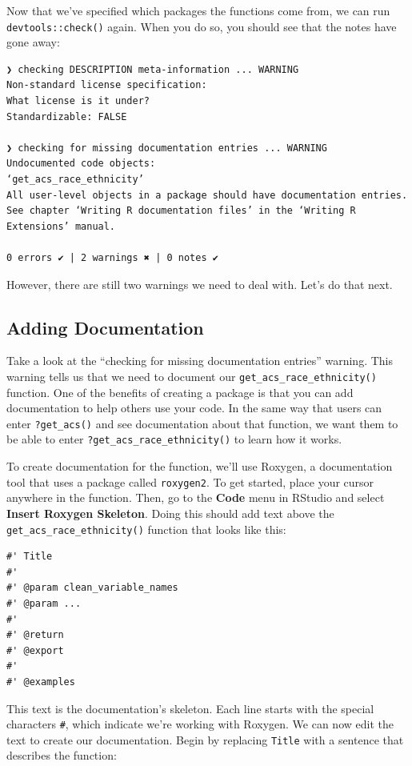 \documentclass[
]{book}
\begin{document}
Now that we've specified which packages the functions come from, we can run \texttt{devtools::check()} again. When you do so, you should see that the notes have gone away:

\begin{verbatim}
❯ checking DESCRIPTION meta-information ... WARNING
Non-standard license specification:
What license is it under?
Standardizable: FALSE

❯ checking for missing documentation entries ... WARNING
Undocumented code objects:
‘get_acs_race_ethnicity’
All user-level objects in a package should have documentation entries.
See chapter ‘Writing R documentation files’ in the ‘Writing R
Extensions’ manual.

0 errors ✔ | 2 warnings ✖ | 0 notes ✔
\end{verbatim}

However, there are still two warnings we need to deal with. Let's do that next.

\hypertarget{adding-documentation}{%
\subsection*{Adding Documentation}\label{adding-documentation}}

Take a look at the ``checking for missing documentation entries'' warning. This warning tells us that we need to document our \texttt{get\_acs\_race\_ethnicity()} function. One of the benefits of creating a package is that you can add documentation to help others use your code. In the same way that users can enter \texttt{?get\_acs()} and see documentation about that function, we want them to be able to enter \texttt{?get\_acs\_race\_ethnicity()} to learn how it works.

To create documentation for the function, we'll use Roxygen, a documentation tool that uses a package called \texttt{roxygen2}. To get started, place your cursor anywhere in the function. Then, go to the \textbf{Code} menu in RStudio and select \textbf{Insert Roxygen Skeleton}. Doing this should add text above the \texttt{get\_acs\_race\_ethnicity()} function that looks like this:

\begin{verbatim}
#' Title
#'
#' @param clean_variable_names 
#' @param ... 
#'
#' @return
#' @export
#'
#' @examples
\end{verbatim}

This text is the documentation's skeleton. Each line starts with the special characters \texttt{\#\textquotesingle{}}, which indicate we're working with Roxygen. We can now edit the text to create our documentation. Begin by replacing \texttt{Title} with a sentence that describes the function:
\end{document}
